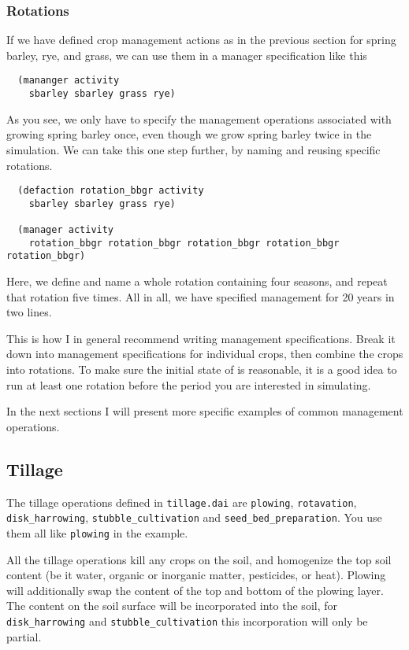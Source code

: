 \documentclass[a4paper,11pt]{article}
\begin{document}
\subsubsection{Rotations}
\label{sec:rotations}

If we have defined crop management actions as in the previous section
for spring barley, rye, and grass, we can use them in a
manager specification like this
\begin{verbatim}
  (mananger activity
    sbarley sbarley grass rye)
\end{verbatim}

As you see, we only have to specify the management operations
associated with growing spring barley once, even though we grow spring
barley twice in the simulation.  We can take this one step further, by
naming and reusing specific rotations.
\begin{verbatim}
  (defaction rotation_bbgr activity
    sbarley sbarley grass rye)

  (manager activity
    rotation_bbgr rotation_bbgr rotation_bbgr rotation_bbgr rotation_bbgr)
\end{verbatim}
Here, we define and name a whole rotation containing four seasons, and
repeat that rotation five times.  All in all, we have specified
management for 20 years in two lines.

This is how I in general recommend writing management specifications.
Break it down into management specifications for individual crops,
then combine the crops into rotations.  To make sure the initial state
of \daisy{} is reasonable, it is a good idea to run at least one
rotation before the period you are interested in simulating.  

In the next sections I will
present more specific examples of common management operations.

\subsection{Tillage}
\label{sec:tillage}

The tillage operations defined in \texttt{tillage.dai} are
\texttt{plowing}, \texttt{rotavation}, \texttt{disk\_harrowing},
\texttt{stubble\_cultivation} and \texttt{seed\_bed\_preparation}.
You use them all like \texttt{plowing} in the example.

All the tillage operations kill any crops on the soil, and homogenize
the top soil content (be it water, organic or inorganic matter,
pesticides, or heat).  Plowing will additionally swap the content of
the top and bottom of the plowing layer.  The content on the soil
surface will be incorporated into the soil, for
\texttt{disk\_harrowing} and \texttt{stubble\_cultivation} this
incorporation will only be partial.
\end{document}
